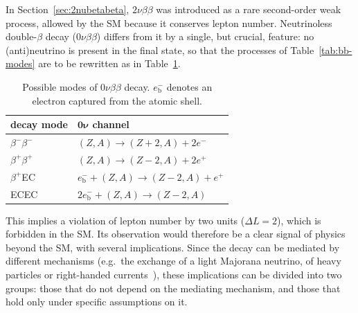 In Section~\ref{sec:2nubetabeta}, $2\nu\beta\beta$ was introduced as a rare second-order weak process, allowed by the \ac{SM} because it conserves lepton number. Neutrinoless double-$\beta$ decay ($0\nu\beta\beta$) differs from it by a single, but crucial, feature: no (anti)neutrino is present in the final state, so that the processes of Table~\ref{tab:bb-modes} are to be rewritten as in Table~\ref{tab:0nubb-modes}.


\begin{table}[H]
    \centering
    \begin{tabular}{ll}
        \toprule
        \textbf{decay mode} & $\boldsymbol{0\nu}$ \textbf{channel} \\
        \midrule
        $\beta^-\beta^-$ & $(Z,A) \to (Z+2,A) + 2e^-$\\
        $\beta^+\beta^+$ & $(Z,A) \to (Z-2,A) + 2e^+$\\
        $\beta^+$\ac{EC} & $e^-_\text{b} + (Z,A) \to (Z-2,A) + e^+$ \\
        \ac{EC}\ac{EC} & $2e^-_\text{b} + (Z,A) \to (Z-2,A)$\\
        \bottomrule
    \end{tabular}
    \caption{Possible modes of $0\nu\beta\beta$ decay. $e^-_\text{b}$ denotes an electron captured from the atomic shell.}
    \label{tab:0nubb-modes}
\end{table}


This implies a violation of lepton number by two units ($\Delta L=2$), which is forbidden in the \ac{SM}. Its observation would therefore be a clear signal of physics beyond the \ac{SM}, with several implications. Since the decay can be mediated by different mechanisms (e.g.\ the exchange of a light Majorana neutrino, of heavy particles or right-handed currents~\cite{review-0nu-2015}), these implications can be divided into two groups: those that do not depend on the mediating mechanism, and those that hold only under specific assumptions on it.

